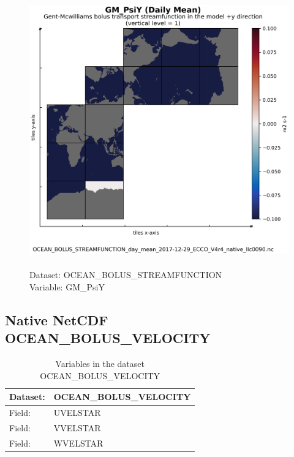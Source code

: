 \begin{figure}[H]
\centering
\includegraphics[scale=0.5]{../images/plots/native_plots/Gent-McWilliams_Bolus_Transport_Streamfunction/GM_PsiY.png}
\caption{\\Dataset: OCEAN\_BOLUS\_STREAMFUNCTION\\Variable: GM\_PsiY}
\label{tab:table-OCEAN_BOLUS_STREAMFUNCTION_GM_PsiY-Plot}
\end{figure}
\pagebreak
\subsection{Native NetCDF OCEAN\_BOLUS\_VELOCITY}
\newp
\begin{longtable}{|p{}|p{}|}
\caption{Variables in the dataset OCEAN\_BOLUS\_VELOCITY}
\label{tab:table-OCEAN_BOLUS_VELOCITY-fields} \\ 
\hline \endhead \hline \endfoot
\rowcolor{lightgray} \textbf{Dataset:} & \textbf{OCEAN\_BOLUS\_VELOCITY} \\ \hline
Field: &UVELSTAR \\ \hline
Field: &VVELSTAR \\ \hline
Field: &WVELSTAR \\ \hline
\end{longtable}

\pagebreak
